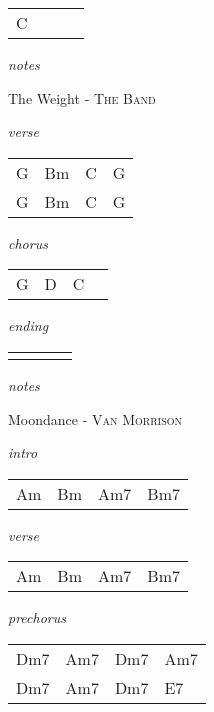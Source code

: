 \documentclass[12pt]{article}
\begin{document}
\begin{tabular}{|P{1.25in}|P{1.25in}|P{1.25in}|P{1.25in}|}
  C &   &   &   \\
\end{tabular}

\textit{notes}

\newpage

{\Huge The Weight} {\huge - \textsc{The Band}}

\huge
\textit{verse}

\begin{tabular}{|P{1.25in}|P{1.25in}|P{1.25in}|P{1.25in}|}
  G  & Bm  & C  &  G \\
  G  & Bm  & C  &  G \\
\end{tabular}

\textit{chorus}

\begin{tabular}{|P{1.25in}|P{1.25in}|P{1.25in}|P{1.25in}|}
  G  &  D &  C &   \\
\end{tabular}

\textit{ending}

\begin{tabular}{|P{1.25in}|P{1.25in}|P{1.25in}|P{1.25in}|}
    &   &   &   \\
\end{tabular}

\textit{notes}

\newpage


{\Huge Moondance} {\huge - \textsc{Van Morrison}}

\huge
\textit{intro}

\begin{tabular}{|P{1.25in}|P{1.25in}|P{1.25in}|P{1.25in}|}
  Am  & Bm  & Am7  & Bm7  \\
\end{tabular}

\textit{verse}

\begin{tabular}{|P{1.25in}|P{1.25in}|P{1.25in}|P{1.25in}|}
  Am  & Bm  & Am7  & Bm7  \\
\end{tabular}

\textit{prechorus}

\begin{tabular}{|P{1.25in}|P{1.25in}|P{1.25in}|P{1.25in}|}
  Dm7  & Am7  &  Dm7 &  Am7 \\
  Dm7  & Am7  &  Dm7 &  E7 \\
\end{tabular}
\end{document}
